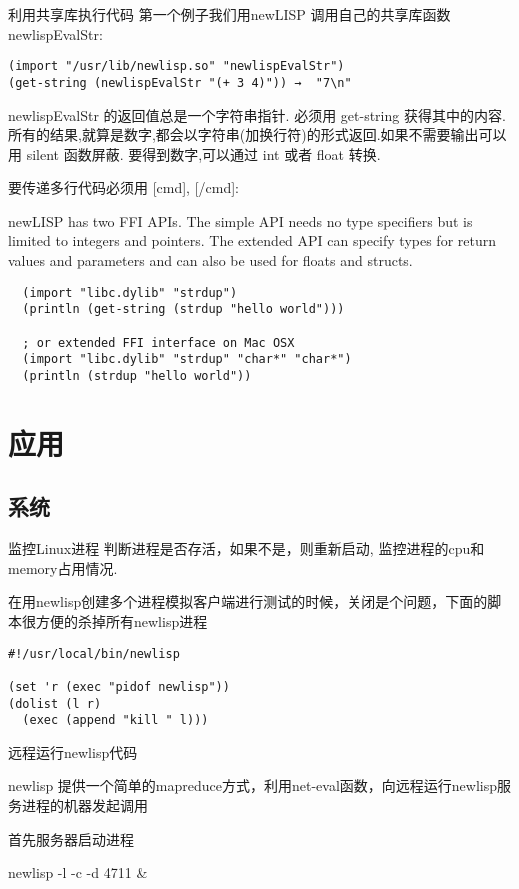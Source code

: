 \documentclass[cn,11pt]{elegantbook}
\begin{document}
利用共享库执行代码
第一个例子我们用newLISP 调用自己的共享库函数 newlispEvalStr:
\begin{lstlisting}
(import "/usr/lib/newlisp.so" "newlispEvalStr")
(get-string (newlispEvalStr "(+ 3 4)")) →  "7\n"
\end{lstlisting}

newlispEvalStr 的返回值总是一个字符串指针. 必须用 get-string 获得其中的内容. 所有的结果,就算是数字,都会以字符串(加换行符)的形式返回.如果不需要输出可以用 silent 函数屏蔽. 要得到数字,可以通过 int 或者 float 转换.

要传递多行代码必须用 [cmd], [/cmd]:


newLISP has two FFI APIs. The simple API needs no type specifiers but is limited to integers and pointers. The extended API can specify types for return values and parameters and can also be used for floats and structs.

\begin{lstlisting}
  (import "libc.dylib" "strdup")
  (println (get-string (strdup "hello world")))

  ; or extended FFI interface on Mac OSX
  (import "libc.dylib" "strdup" "char*" "char*")
  (println (strdup "hello world"))
\end{lstlisting}

\section{应用}

\subsection{系统}
监控Linux进程
判断进程是否存活，如果不是，则重新启动, 监控进程的cpu和memory占用情况.

在用newlisp创建多个进程模拟客户端进行测试的时候，关闭是个问题，下面的脚本很方便的杀掉所有newlisp进程

\begin{lstlisting}[lisp]
#!/usr/local/bin/newlisp

(set 'r (exec "pidof newlisp"))
(dolist (l r)
  (exec (append "kill " l)))
\end{lstlisting}

远程运行newlisp代码

newlisp 提供一个简单的mapreduce方式，利用net-eval函数，向远程运行newlisp服务进程的机器发起调用

首先服务器启动进程

newlisp -l -c -d 4711 &
\end{document}
